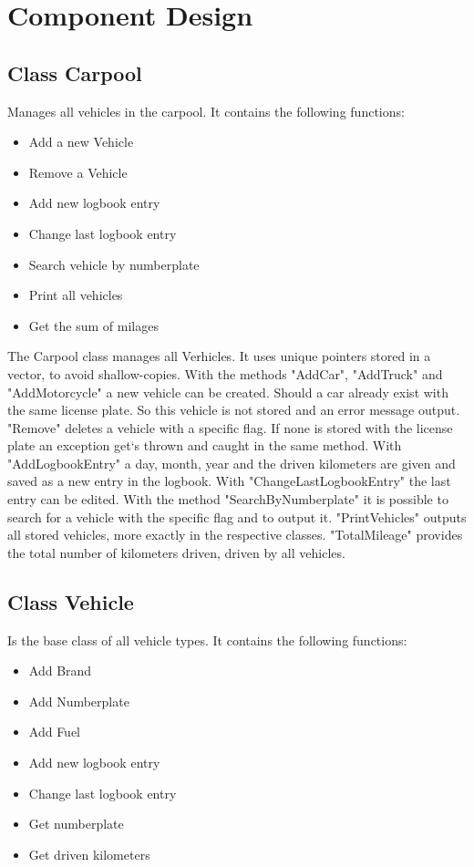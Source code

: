 \section{Component Design}
\subsection{Class Carpool}
Manages all vehicles in the carpool.
It contains the following functions:
\begin{itemize}
	\item Add a new Vehicle
	\item Remove a Vehicle
	\item Add new logbook entry
	\item Change last logbook entry
	\item Search vehicle by numberplate
	\item Print all vehicles
	\item Get the sum of milages
\end{itemize}

The Carpool class manages all Verhicles. It uses unique pointers stored in a vector, to avoid shallow-copies.
With the methods "AddCar", "AddTruck" and "AddMotorcycle" a new vehicle can be created. Should a car already exist with the same license plate. So this vehicle is not stored and an error message output.
"Remove" deletes a vehicle with a specific flag. If none is stored with the license plate an exception get`s thrown and caught in the same method.
With "AddLogbookEntry" a day, month, year and the driven kilometers are given and saved as a new entry in the logbook.
With "ChangeLastLogbookEntry" the last entry can be edited.
With the method "SearchByNumberplate" it is possible to search for a vehicle with the specific flag and to output it.
"PrintVehicles" outputs all stored vehicles, more exactly in the respective classes.
"TotalMileage" provides the total number of kilometers driven, driven by all vehicles.

\subsection{Class Vehicle}
Is the base class of all vehicle types.
It contains the following functions:
\begin{itemize}
	\item Add Brand
	\item Add Numberplate
	\item Add Fuel
	\item Add new logbook entry
	\item Change last logbook entry
	\item Get numberplate
	\item Get driven kilometers
\end{itemize}

